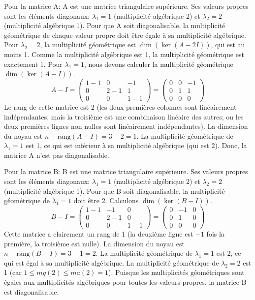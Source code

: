 \begin{solution}
Pour la matrice A:
A est une matrice triangulaire supérieure. Ses valeurs propres sont les éléments diagonaux: $\lambda_1 = 1$ (multiplicité algébrique 2) et $\lambda_2 = 2$ (multiplicité algébrique 1).
Pour que A soit diagonalisable, la multiplicité géométrique de chaque valeur propre doit être égale à sa multiplicité algébrique.
Pour $\lambda_2 = 2$, la multiplicité géométrique est $\dim(\ker(A-2I))$, qui est au moins 1. Comme la multiplicité algébrique est 1, la multiplicité géométrique est exactement 1.
Pour $\lambda_1 = 1$, nous devons calculer la multiplicité géométrique $\dim(\ker(A-I))$.
\[ A-I = \begin{pmatrix} 1-1 & 0 & -1 \\ 0 & 2-1 & 1 \\ 0 & 0 & 1-1 \end{pmatrix} = \begin{pmatrix} 0 & 0 & -1 \\ 0 & 1 & 1 \\ 0 & 0 & 0 \end{pmatrix} \]
Le rang de cette matrice est 2 (les deux premières colonnes sont linéairement indépendantes, mais la troisième est une combinaison linéaire des autres; ou les deux premières lignes non nulles sont linéairement indépendantes).
La dimension du noyau est $n - \text{rang}(A-I) = 3 - 2 = 1$.
La multiplicité géométrique de $\lambda_1 = 1$ est 1, ce qui est inférieur à sa multiplicité algébrique (qui est 2).
Donc, la matrice A n'est pas diagonalisable.

Pour la matrice B:
B est une matrice triangulaire supérieure. Ses valeurs propres sont les éléments diagonaux: $\lambda_1 = 1$ (multiplicité algébrique 2) et $\lambda_2 = 2$ (multiplicité algébrique 1).
Pour que B soit diagonalisable, la multiplicité géométrique de $\lambda_1 = 1$ doit être 2.
Calculons $\dim(\ker(B-I))$.
\[ B-I = \begin{pmatrix} 1-1 & -1 & 0 \\ 0 & 2-1 & 0 \\ 0 & 0 & 1-1 \end{pmatrix} = \begin{pmatrix} 0 & -1 & 0 \\ 0 & 1 & 0 \\ 0 & 0 & 0 \end{pmatrix} \]
Cette matrice a clairement un rang de 1 (la deuxième ligne est $-1$ fois la première, la troisième est nulle).
La dimension du noyau est $n - \text{rang}(B-I) = 3 - 1 = 2$.
La multiplicité géométrique de $\lambda_1 = 1$ est 2, ce qui est égal à sa multiplicité algébrique.
La multiplicité géométrique de $\lambda_2 = 2$ est 1 (car $1 \le mg(2) \le ma(2)=1$).
Puisque les multiplicités géométriques sont égales aux multiplicités algébriques pour toutes les valeurs propres, la matrice B est diagonalisable.
\end{solution}

